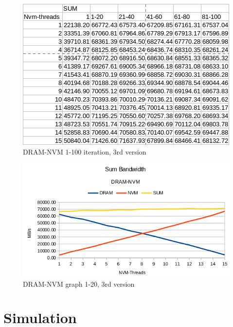 \documentclass[12pt,a4paper,USenglish]{article}      %
\begin{document}
\begin{figure}[!hbtp]
\includegraphics[scale=0.7]{DRAM-NVM_table_p2_1-100_v3}
\caption{DRAM-NVM 1-100 iteration, 3rd version}
\end{figure}

\begin{figure}[!hbtp]
\includegraphics[scale=0.7]{DRAM-NVM_Graph_1-20_v3}
\caption{DRAM-NVM graph 1-20, 3rd version}
\end{figure}


\clearpage
\section{Simulation}
\end{document}

